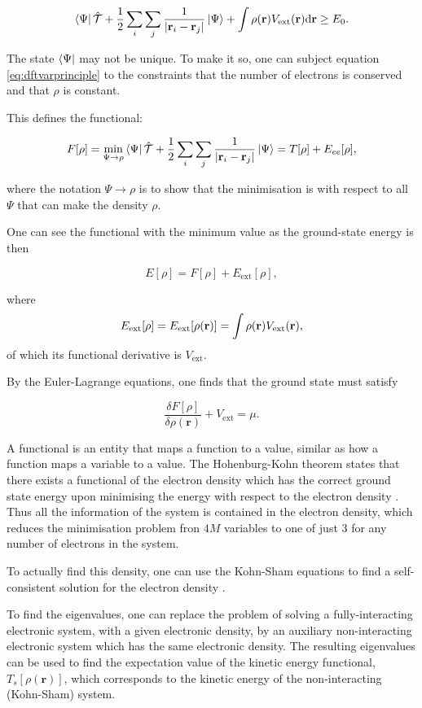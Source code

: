 \documentclass[a4paper,11pt]{article}
\numberwithin{equation}{chapter}
\numberwithin{listing}{chapter}
\begin{document}
\[ \bra{\Psi} \mathcal{\hat{T}} + \frac{1}{2} \sum_i\sum_j \frac{1}{| \mathbf{r}_i -
\mathbf{r}_j |}  \ket{\Psi} + \int \rho(\mathbf{r}) V_{\text{ext}}(\mathbf{r})
\text{d}\mathbf{r} \geq E_0. 
\label{eq:dftvarprinciple} \]

The state \(\bra{\Psi}\) may not be unique. To make it so, one can subject equation \ref{eq:dftvarprinciple}
to the constraints that the number of electrons is conserved and that \(\rho\) is constant. 

This defines the functional: 

\[ F[\rho] = \underset{\Psi \rightarrow \rho}{\text{min}} \bra{\Psi} \mathcal{\hat{T}} +
\frac{1}{2} \sum_i\sum_j \frac{1}{| \mathbf{r}_i - \mathbf{r}_j |}  \ket{\Psi} = T[\rho] +
E_{ee}[\rho],   \]

where the notation \(\Psi \rightarrow \rho\) is to show that the minimisation is with respect to
all \(\Psi\) that can make the density \(\rho\). 

One can see the functional with the minimum value as the ground-state energy is then 

\[ E[\rho] = F[\rho] + E_{\text{ext}}[\rho], \]

where \[ E_{\text{ext}}[\rho] = E_{\text{ext}}[\rho(\mathbf{r})] =  \int \rho(\mathbf{r})
V_{\text{\text{ext}}}(\mathbf{r}), \]
of which its functional derivative is \(V_{\text{ext}}\).

By the Euler-Lagrange equations, one finds that the ground state must satisfy 

\[ \frac{\delta F[\rho]}{\delta \rho(\mathbf{r}) } + V_{\text{ext}}= \mu. \]

A functional is an entity that maps a function to a value, similar as how a function maps a
variable to a value. The Hohenburg-Kohn theorem states that there exists a functional of the
electron density which has the correct ground state energy upon minimising the energy with respect to
the electron density \cite{hohenburg64_inhomog_electron_gas}. Thus all the information of the
system is contained in the electron density, which reduces the minimisation
problem fron \(4M\) variables to one of just 3 for any number of electrons in the system. 

To actually find this density, one can use the Kohn-Sham equations to find a self-consistent
solution for the electron density \cite{kohn65_self_cons_eq}. 




To find the eigenvalues, one can replace the problem of solving a fully-interacting electronic
system, with a given electronic density, by an auxiliary non-interacting electronic system which has
the same electronic density. The resulting eigenvalues can be used to find the expectation value of
the kinetic energy functional, \(T_s[\rho(\mathbf{r})]\), which corresponds to the kinetic energy of the
non-interacting (Kohn-Sham) system.
\end{document}
